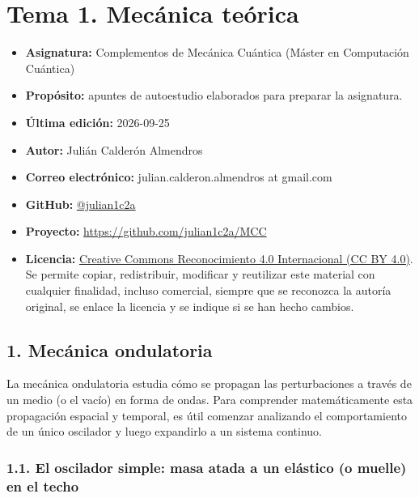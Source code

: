 \documentclass[
  spanish,
]{article}
\author{Julián Calderón Almendros}
\date{}
\providecommand{\tightlist}{%
  \setlength{\itemsep}{0pt}\setlength{\parskip}{0pt}}
\begin{document}
\newcommand{\bsS}{\boldsymbol{S}}
\newcommand{\bsL}{\boldsymbol{L}}
\newcommand{\bsH}{\boldsymbol{H}}
\newcommand{\bsT}{\boldsymbol{T}}
\newcommand{\bsdelta}{\boldsymbol{\delta}}

\section{Tema 1. Mecánica teórica}\label{tema-1.-mecuxe1nica-teuxf3rica}

\begin{itemize}
\tightlist
\item
  \textbf{Asignatura:} Complementos de Mecánica Cuántica (Máster en
  Computación Cuántica)
\item
  \textbf{Propósito:} apuntes de autoestudio elaborados para preparar la
  asignatura.
\item
  \textbf{Última edición:} 2026-09-25
\item
  \textbf{Autor:} Julián Calderón Almendros
\item
  \textbf{Correo electrónico:} julian.calderon.almendros at gmail.com
\item
  \textbf{GitHub:} \href{https://github.com/julian1c2a}{@julian1c2a}
\item
  \textbf{Proyecto:} \url{https://github.com/julian1c2a/MCC}
\item
  \textbf{Licencia:}
  \href{https://creativecommons.org/licenses/by/4.0/deed.es}{Creative
  Commons Reconocimiento 4.0 Internacional (CC BY 4.0)}. Se permite
  copiar, redistribuir, modificar y reutilizar este material con
  cualquier finalidad, incluso comercial, siempre que se reconozca la
  autoría original, se enlace la licencia y se indique si se han hecho
  cambios.
\end{itemize}

\subsection{1. Mecánica ondulatoria}\label{mecuxe1nica-ondulatoria}

La mecánica ondulatoria estudia cómo se propagan las perturbaciones a
través de un medio (o el vacío) en forma de ondas. Para comprender
matemáticamente esta propagación espacial y temporal, es útil comenzar
analizando el comportamiento de un único oscilador y luego expandirlo a
un sistema continuo.

\subsubsection{1.1. El oscilador simple: masa atada a un elástico (o
muelle) en el
techo}\label{el-oscilador-simple-masa-atada-a-un-eluxe1stico-o-muelle-en-el-techo}
\end{document}
